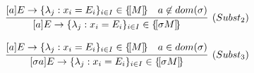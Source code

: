 \begin{displaymath}
\begin{array}{ccc}
{      }
    \\\\
    \infer[\mathsf{(Subst_2)}]
    {
    \cmd {a}E{\lambda_j}{x_i}{E_i}{i\in I}\in \sem{\sigma M}{}
    }
    {
    \cmd {a}E{\lambda_j}{x_i}{E_i}{i\in I}\in \sem{M}{}
    & a\not\in\mathsf{dom}(\sigma)
      }
    \\\\
    \infer[\mathsf{(Subst_3)}]
    {
    \cmd {\sigma a}E{\lambda_j}{x_i}{E_i}{i\in I}\in \sem{\sigma M}{}
    }
    {
    \cmd {a}E{\lambda_j}{x_i}{E_i}{i\in I}\in \sem{M}{}
    & a\in\mathsf{dom}(\sigma)
      }
  \end{array}
\end{displaymath}

